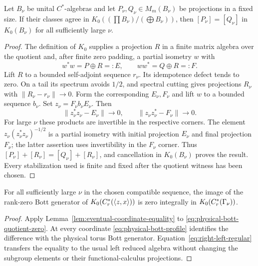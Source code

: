 \begin{lemma}\label{lem:eventual-coordinate-equality}
Let $B_\nu$ be unital $C^*$-algebras and let
$P_\nu,Q_\nu\in M_m(B_\nu)$ be projections in a fixed size.
If their classes agree in
$K_0((\prod B_\nu)/(\bigoplus B_\nu))$, then
$[P_\nu]=[Q_\nu]$ in $K_0(B_\nu)$ for all sufficiently large $\nu$.
\end{lemma}

\begin{proof}
The definition of $K_0$ supplies a projection $R$ in a finite matrix algebra
over the quotient and, after finite zero padding, a partial isometry $w$
with
\[
 w^*w=P\oplus R=:E,\qquad ww^*=Q\oplus R=:F.
\]
Lift $R$ to a bounded self-adjoint sequence $r_\nu$.  Its idempotence defect
tends to zero.  On a tail its spectrum avoids $1/2$, and spectral cutting
gives projections $R_\nu$ with $\|R_\nu-r_\nu\|\to0$.  Form the
corresponding $E_\nu,F_\nu$ and lift $w$ to a bounded sequence $b_\nu$.
Set $z_\nu=F_\nu b_\nu E_\nu$.  Then
\[
 \|z_\nu^*z_\nu-E_\nu\|\to0,
 \qquad\|z_\nu z_\nu^*-F_\nu\|\to0.
\]
For large $\nu$ these products are invertible in the respective corners.
The element
$z_\nu(z_\nu^*z_\nu)^{-1/2}$ is a partial isometry with initial
projection $E_\nu$ and final projection $F_\nu$; the latter assertion uses
invertibility in the $F_\nu$ corner.  Thus
$[P_\nu]+[R_\nu]=[Q_\nu]+[R_\nu]$, and cancellation in $K_0(B_\nu)$
proves the result.  Every stabilization used is finite and fixed after the
quotient witness has been chosen.
\end{proof}

\begin{proposition}\label{prop:reduced-bott-vanishing}
For all sufficiently large $\nu$ in the chosen compatible sequence, the image
of the rank-zero Bott generator of $K_0(C_r^*(\langle z,x\rangle))$ is zero integrally in
$K_0(C_r^*(\Gamma_\nu))$.
\end{proposition}

\begin{proof}
Apply Lemma~\ref{lem:eventual-coordinate-equality} to
\eqref{eq:physical-bott-quotient-zero}.  At every coordinate
\eqref{eq:physical-bott-profile} identifies the difference with the physical
torus Bott generator.  Equation~\eqref{eq:right-left-regular} transfers the
equality to the usual left reduced algebra without changing the subgroup
elements or their functional-calculus projections.
\end{proof}

